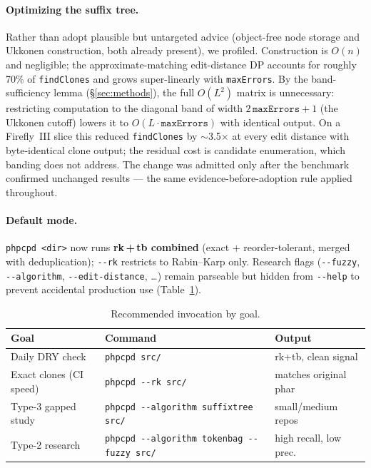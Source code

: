 \documentclass[10pt,a4paper]{article}
\newcounter{lem}[section]
\begin{document}
\paragraph{Optimizing the suffix tree.} Rather than adopt plausible but untargeted advice (object-free
node storage and Ukkonen construction, both already present), we profiled. Construction is $O(n)$ and
negligible; the approximate-matching edit-distance DP accounts for roughly 70\% of \texttt{findClones}
and grows super-linearly with \texttt{maxErrors}. By the band-sufficiency lemma (\S\ref{sec:methods}),
the full $O(L^2)$ matrix is unnecessary: restricting computation to the diagonal band of width
$2\,\texttt{maxErrors}+1$ (the Ukkonen cutoff) lowers it to $O(L\cdot\texttt{maxErrors})$ with identical
output. On a Firefly~III slice this reduced \texttt{findClones} by
$\sim$3.5$\times$ at every edit distance with byte-identical clone output; the residual cost is
candidate enumeration, which banding does not address. The change was admitted only after the benchmark
confirmed unchanged results --- the same evidence-before-adoption rule applied throughout.

\paragraph{Default mode.} \texttt{phpcpd <dir>} now runs \textbf{rk\,+\,tb combined} (exact $+$
reorder-tolerant, merged with deduplication); \texttt{-{}-rk} restricts to Rabin--Karp only. Research
flags (\texttt{-{}-fuzzy}, \texttt{-{}-algorithm}, \texttt{-{}-edit-distance}, \dots) remain
parseable but hidden from \texttt{-{}-help} to prevent accidental production use
(Table~\ref{tab:reco}).

\begin{table}[h]
\centering
\caption{Recommended invocation by goal.}
\label{tab:reco}
\small
\begin{tabular}{l l l}
\toprule
\textbf{Goal} & \textbf{Command} & \textbf{Output} \\
\midrule
Daily DRY check       & \texttt{phpcpd src/}                       & rk+tb, clean signal \\
Exact clones (CI speed)& \texttt{phpcpd -{}-rk src/}               & matches original phar \\
Type-3 gapped study   & \texttt{phpcpd -{}-algorithm suffixtree src/} & small/medium repos \\
Type-2 research       & \texttt{phpcpd -{}-algorithm tokenbag -{}-fuzzy src/} & high recall, low prec. \\
\bottomrule
\end{tabular}
\end{table}
\end{document}
